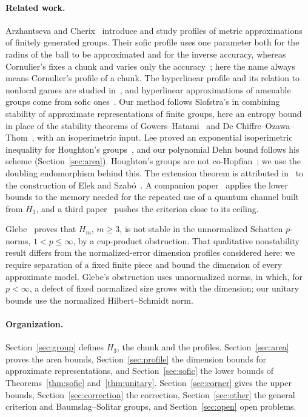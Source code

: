 \documentclass[11pt,a4paper]{article}
\theoremstyle{plain}
\theoremstyle{definition}
\theoremstyle{remark}
\begin{document}
\paragraph{Related work.} Arzhantseva and Cherix~\cite{ArzhantsevaCherix2020} introduce and study profiles of metric approximations of
finitely generated groups. Their sofic profile uses one parameter both for the radius of the ball to be approximated and for the inverse
accuracy, whereas Cornulier's fixes a chunk and varies only the accuracy~\cite[Section~4.5]{ArzhantsevaCherix2020}; here the name always
means Cornulier's profile of a chunk. The hyperlinear
profile and its relation to nonlocal games are studied in~\cite{SlofstraVidick2018,Slofstra2018}, and hyperlinear approximations of
amenable groups come from sofic ones~\cite{BCJM2023}. Our method follows Slofstra's in combining stability of approximate
representations of finite groups, here an entropy bound in place of the stability theorems of Gowers--Hatami~\cite{GowersHatami2017}
and De Chiffre--Ozawa--Thom~\cite{DOT2019}, with an isoperimetric input. Lee proved an exponential isoperimetric inequality for
Houghton's groups~\cite{Lee2012}, and our polynomial Dehn bound follows his scheme (Section~\ref{sec:area}). Houghton's groups are not
co-Hopfian~\cite{BCMR2014}; we use the doubling endomorphism behind this. The extension
theorem is attributed in~\cite{Cornulier2013} to the construction of Elek and Szabó~\cite{ElekSzabo2006}. A companion paper~\cite{DouglasMghirbiB} applies the
lower bounds to the memory needed for the repeated use of a quantum channel built from $H_3$, and a third paper~\cite{DouglasMghirbiC} pushes the
criterion close to its ceiling.

Glebe~\cite[Corollary~4.5]{Glebe2025} proves that $H_m$, $m\ge3$, is not stable
in the unnormalized Schatten $p$-norms, $1<p\le\infty$, by a cup-product
obstruction. That qualitative nonstability result differs from the
normalized-error dimension profiles considered here: we require separation of
a fixed finite piece and bound the dimension of every approximate model.
Glebe's obstruction uses unnormalized norms, in which, for $p<\infty$, a defect
of fixed normalized size grows with the dimension; our unitary bounds use the
normalized Hilbert--Schmidt norm.

\paragraph{Organization.} Section~\ref{sec:group} defines $H_3$, the chunk and the profiles. Section~\ref{sec:area} proves the area bounds,
Section~\ref{sec:profile} the dimension bounds for approximate representations, and Section~\ref{sec:sofic} the lower bounds of
Theorems~\ref{thm:sofic} and~\ref{thm:unitary}. Section~\ref{sec:corner} gives the upper bounds, Section~\ref{sec:correction} the correction,
Section~\ref{sec:other} the general criterion and Baumslag--Solitar groups, and
Section~\ref{sec:open} open problems.
\end{document}
